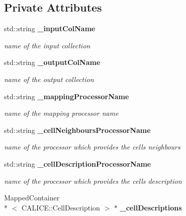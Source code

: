 \subsection*{Private Attributes}
\begin{DoxyCompactItemize}
\item 
std\-::string {\bf \-\_\-input\-Col\-Name}\label{classCALICE_1_1AhcGangingProcessor_ae262d7ff2edd810ae0cc70ab146d3391}

\begin{DoxyCompactList}\small\item\em name of the input collection \end{DoxyCompactList}\item 
std\-::string {\bf \-\_\-output\-Col\-Name}\label{classCALICE_1_1AhcGangingProcessor_a54dca9b895d4f5c53f4852d3d85b105a}

\begin{DoxyCompactList}\small\item\em name of the output collection \end{DoxyCompactList}\item 
std\-::string {\bf \-\_\-mapping\-Processor\-Name}\label{classCALICE_1_1AhcGangingProcessor_afe6bd13c1a2131da9f7d78cc10e45086}

\begin{DoxyCompactList}\small\item\em name of the mapping processor name \end{DoxyCompactList}\item 
std\-::string {\bf \-\_\-cell\-Neighbours\-Processor\-Name}\label{classCALICE_1_1AhcGangingProcessor_aa2d3fd6847cd991e38298f6fe4646e02}

\begin{DoxyCompactList}\small\item\em name of the processor which provides the cells neighbours \end{DoxyCompactList}\item 
std\-::string {\bf \-\_\-cell\-Description\-Processor\-Name}\label{classCALICE_1_1AhcGangingProcessor_ad267d00752eb45681cdd337a3c27e709}

\begin{DoxyCompactList}\small\item\em name of the processor which provides the cells description \end{DoxyCompactList}\item 
Mapped\-Container\\*
$<$ C\-A\-L\-I\-C\-E\-::\-Cell\-Description $>$ $\ast$ {\bf \-\_\-cell\-Descriptions}\label{classCALICE_1_1AhcGangingProcessor_a78a2caa52dd8f07379cc1149bda1c569}


\end{DoxyCompactItemize}
